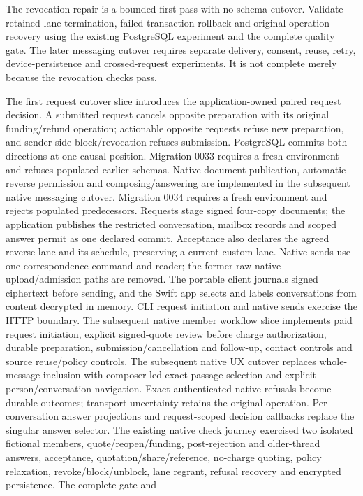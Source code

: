 \documentclass[11pt]{article}
\begin{document}
The revocation repair is a bounded first pass with no schema cutover. Validate
retained-lane termination, failed-transaction rollback and original-operation
recovery using the existing PostgreSQL experiment and the complete quality gate.
The later messaging cutover requires separate delivery, consent, reuse, retry,
device-persistence and crossed-request experiments. It is not complete merely
because the revocation checks pass.

The first request cutover slice introduces the application-owned paired request
decision. A submitted request cancels opposite preparation with its original
funding/refund operation; actionable opposite requests refuse new preparation,
and sender-side block/revocation refuses submission. PostgreSQL commits both
directions at one causal position. Migration 0033 requires a fresh environment
and refuses populated earlier schemas. Native document publication, automatic
reverse permission and composing/answering are implemented in the subsequent
native messaging cutover. Migration 0034 requires a fresh environment and rejects
populated predecessors. Requests stage signed four-copy documents; the application
publishes the restricted conversation, mailbox records and scoped answer permit as
one declared commit. Acceptance also declares the agreed reverse lane and its
schedule, preserving a current custom lane. Native sends use one correspondence
command and reader; the former raw native upload/admission paths are removed.
The portable client journals signed ciphertext before sending, and the Swift app
selects and labels conversations from content decrypted in memory. CLI request
initiation and native sends exercise the HTTP boundary. The subsequent native member workflow slice implements paid request initiation,
explicit signed-quote review before charge authorization, durable preparation,
submission/cancellation and follow-up, contact controls and source reuse/policy
controls. The subsequent native UX cutover replaces whole-message inclusion with
composer-led exact passage selection and explicit person/conversation navigation. Exact authenticated native refusals become durable outcomes;
transport uncertainty retains the original operation. Per-conversation answer
projections and request-scoped decision callbacks replace the singular answer
selector. The existing native check journey exercised two isolated fictional
members, quote/reopen/funding, post-rejection and older-thread answers, acceptance,
quotation/share/reference, no-charge quoting, policy relaxation, revoke/block/unblock,
lane regrant, refusal recovery and encrypted persistence. The complete gate and
\end{document}

